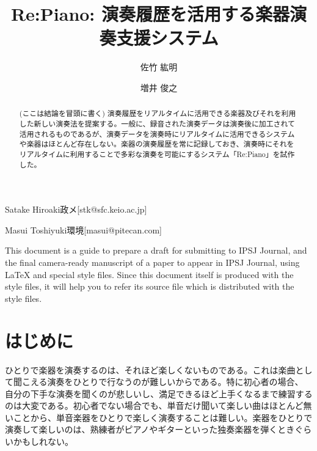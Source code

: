 \documentclass[submit,techreq]{ec2017}
\begin{document}
\title{Re:Piano: 演奏履歴を活用する楽器演奏支援システム}



\author{佐竹 紘明}{Satake Hiroaki}{政メ}[stk@sfc.keio.ac.jp]
\author{増井 俊之}{Masui Toshiyuki}{環境}[masui@pitecan.com]

\begin{abstract}
(ここは結論を冒頭に書く)
 演奏履歴をリアルタイムに活用できる楽器及びそれを利用した新しい演奏法を提案する。一般に、録音された演奏データは演奏後に加工されて活用されるものであるが、演奏データを演奏時にリアルタイムに活用できるシステムや楽器はほとんど存在しない。楽器の演奏履歴を常に記録しておき、演奏時にそれをリアルタイムに利用することで多彩な演奏を可能にするシステム「Re:Piano」を試作した。
\end{abstract}


%
\begin{eabstract}
This document is a guide to prepare a draft for submitting to IPSJ
Journal, and the final camera-ready manuscript of a paper to appear in
IPSJ Journal, using {\LaTeX} and special style files.  Since this
document itself is produced with the style files, it will help you to
refer its source file which is distributed with the style files.
\end{eabstract}



\maketitle

\section{はじめに}
\label{sec:start}

ひとりで楽器を演奏するのは、それほど楽しくないものである。これは楽曲として聞こえる演奏をひとりで行なうのが難しいからである。特に初心者の場合、 自分の下手な演奏を聞くのが悲しいし、満足できるほど上手くなるまで練習するのは大変である。初心者でない場合でも、単音だけ聞いて楽しい曲はほとんど無いことから、単音楽器をひとりで楽しく演奏することは難しい。楽器をひとりで演奏して楽しいのは、熟練者がピアノやギターといった独奏楽器を弾くときぐらいかもしれない。
 
\end{document}
